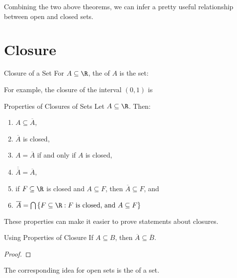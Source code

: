 Combining the two above theorems, we can infer a pretty useful relationship between open and closed sets.


\section{Closure}

\begin{dfnbox}{Closure of a Set}{}
    For $A \subseteq \R$, the  of $A$ is the set: %
\end{dfnbox}

For example, the closure of the interval $(0,1)$ is %

\begin{thmbox}{Properties of Closures of Sets}{}
    Let $A \subseteq \R$. Then:
    \begin{enumerate}[label=(\roman*)]
        \item $A \subseteq \overline{A}$,
        \item $\overline{A}$ is closed,
        \item $A = \overline{A}$ if and only if $A$ is closed,
        \item $\overline{\overline{A}} = \overline{A}$,
        \item if $F \subseteq \R$ is closed and $A \subseteq F$, then $\overline{A} \subseteq F$, and
        \item $\overline{A} = \bigcap \left\{ F \subseteq \R : F\ \text{is closed, and}\ A \subseteq F \right\}$
    \end{enumerate}
\end{thmbox}

These properties can make it easier to prove statements about closures.

\begin{exbox}{Using Properties of Closure}{}
    If $A \subseteq B$, then $\overline{A} \subseteq \overline{B}$.
    \tcblower
    \begin{proof}

    \end{proof}
\end{exbox}

\begin{notebox}
    The corresponding idea for open sets is the  of a set.
\end{notebox}
